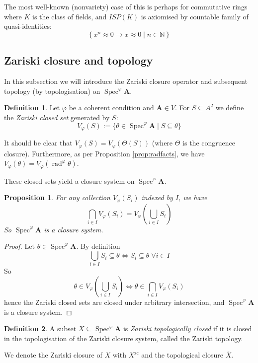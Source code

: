 \documentclass{article}
\theoremstyle{plain}
\newtheorem{proposition}[theorem]{Proposition}
\theoremstyle{definition}
\newtheorem{definition}{Definition}[section]
\newcommand{\Spec}{\operatorname{Spec}}
\newcommand{\rad}{\operatorname{rad}}
\begin{document}
The most well-known (nonvariety) case of this is perhaps for commutative rings where $K$ is the class of fields, and $ISP(K)$ is axiomised by countable family of quasi-identities:
$$\left\{ x^n \approx 0 \rightarrow x\approx 0 \mid n \in \mathbb{N} \right\}$$


\subsection{Zariski closure and topology}

In this subsection we will introduce the Zariski closure operator and subsequent topology (by topologisation) on $\Spec^\varphi\mathbf{A}$.

\begin{definition}
    Let $\varphi$ be a coherent condition and $\mathbf{A} \in V$.
    For $S \subseteq A^2$ we define the \textit{Zariski closed set} generated by $S$:
    $$V_\varphi(S) := \{ \theta \in \Spec^\varphi\mathbf{A} \mid S\subseteq \theta\}$$
\end{definition}

It should be clear that $V_\varphi(S) = V_\varphi(\Theta(S))$ (where 
 $\Theta$ is the congruence closure).
Furthermore, as per Proposition \ref{prop:radfacts}, we have $V_\varphi(\theta) = V_\varphi(\rad^\varphi\theta)$.\par
These closed sets yield a closure system on $\Spec^\varphi\mathbf{A}$.

\begin{proposition}
    For any collection $V_\varphi(S_i)$ indexed by $I$, we have
    $$\bigcap_{i \in I} V_\varphi(S_i) = V_\varphi(\bigcup_{i \in I} S_i)$$
    So $\Spec^\varphi\mathbf{A}$ is a closure system.
\end{proposition}
\begin{proof}
    Let $\theta \in \Spec^\varphi\mathbf{A}$.
    By definition 
    $$\bigcup_{i \in I} S_i \subseteq \theta \iff S_i\subseteq \theta \; \forall i \in I$$
    So
    $$\theta \in V_\varphi(\bigcup_{i \in I} S_i) \iff \theta \in \bigcap_{i \in I} V_\varphi(S_i)$$
    hence the Zariski closed sets are closed under arbitrary intersection, and $\Spec^\varphi\mathbf{A}$ is a closure system.
\end{proof}

\begin{definition}
    A subset $X \subseteq \Spec^\varphi\mathbf{A}$ is \textit{Zariski topologically closed} if it is closed in the topologisation of the Zariski closure system, called the Zariski topology.\par
    We denote the Zariski closure of $X$ with $X^\text{zc}$ and the topological closure $\overline{X}$.
\end{definition}
\end{document}
